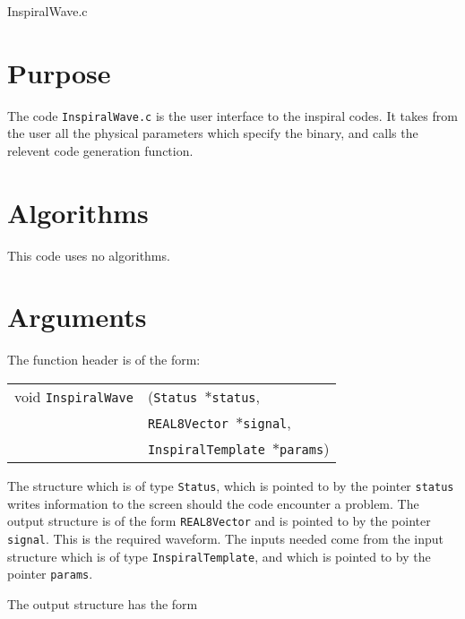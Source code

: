 \documentclass[12pt]{article}
\begin{document}
\huge
\begin{center}
InspiralWave.c
\end{center}
\normalsize
\vspace{10mm}

\section{Purpose}

The code \texttt{InspiralWave.c} is the user interface to the inspiral codes. It takes from the user all the physical parameters which specify the binary, and calls the relevent code generation function.




\section{Algorithms}

This code uses no algorithms.


\section{Arguments}

The function header is of the form:

\vspace{5mm}

\begin{tabular}{ll}
void \texttt{InspiralWave}&(\texttt{Status $\ast$status},     \\
                                   &\texttt{REAL8Vector $\ast$signal}, \\
                                   &\texttt{InspiralTemplate $\ast$params})
\end{tabular}

\vspace{5mm}

The structure which is of type \texttt{Status}, which is pointed to by the pointer \texttt{status} writes information to the screen should the code encounter a problem. The output structure is of the form \texttt{REAL8Vector} and is pointed to by the pointer \texttt{signal}. This is the required waveform.
The inputs needed come from the input structure which is of type \texttt{InspiralTemplate}, and which is pointed to by the pointer \texttt{params}.

The output structure has the form

\vspace{5mm}
\end{document}
